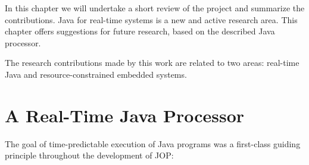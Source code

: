 
In this chapter we will undertake a short review of the project and
summarize the contributions. Java for real-time systems is a new and
active research area. This chapter offers suggestions for future
research, based on the described Java processor.

The research contributions made by this work are related to two
areas: real-time Java and resource-constrained embedded systems.

\section{A Real-Time Java Processor}

The goal of time-predictable execution of Java programs was a
first-class guiding principle throughout the development of JOP:

